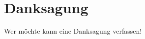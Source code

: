 %
%
\newpage

%
%
\section*{Danksagung}



\color{red} 
Wer m\"ochte kann eine Danksagung verfassen!
\color{black} 